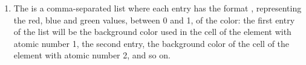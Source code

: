 {\begin{enumerate}
\item The  is a comma-separated list where each entry has the format , representing the red, blue and green values, between 0 and 1, of the color: the first entry of the list will be the background color used in the cell of the element with atomic number 1, the second entry, the background color of the cell of the element with atomic number 2, and so on.
\\ [8pt]
\end{enumerate}
\ %
\\ [-44pt]\ %
\def\tmpSection{\textcolor{cyan}{pgfPTcolorSchemes.html}}%
}
